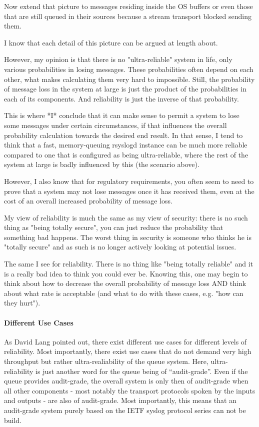 \documentclass[a4paper,10pt]{article}
\begin{document}
Now extend that picture to messages residing inside the OS buffers or even those that are still queued in their sources because a stream transport blocked sending them.

I know that each detail of this picture can be argued at length about.

However, my opinion is that there is no "ultra-reliable" system in life, only various probabilities in losing messages. These probabilities  often depend on each other, what makes calculating them very hard to impossible. Still, the probability of message loss in the system at large is just the product of the probabilities in each of its  components. And reliability is just the inverse of that probability.

This is where *I* conclude that it can make sense to permit a system to lose some messages under certain circumstances, if that influences the overall probability calculation towards the desired end result. In that sense, I tend to think that a fast, memory-queuing rsyslogd instance can be much more reliable compared to one that is configured as being ultra-reliable, where the rest of the system at large is badly influenced by this (the scenario above).

However, I also know that for regulatory requirements, you often seem to need to prove that a system may not lose messages once it has received them, even at the cost of an overall increased probability of message loss.

My view of reliability is much the same as my view of security: there is no such thing as "being totally secure", you can just reduce the probability that something bad happens. The worst thing in security is someone who thinks he is "totally secure" and as such is no longer actively looking at potential issues.

The same I see for reliability. There is no thing like "being totally reliable" and it is a really bad idea to think you could ever be. Knowing this, one may begin to think about how to decrease the overall probability of message loss AND think about what rate is acceptable (and what to do with these cases, e.g. "how can they hurt").

\paragraph{Different Use Cases}
As David Lang pointed out, there exist different use cases for different levels of reliability. Most importantly, there exist use cases that do not demand very high throughput but rather ultra-realiability of the queue system. Here, ultra-reliability is just another word for the queue being of ``audit-grade''. Even if the queue provides audit-grade, the overall system is only then of audit-grade when all other components - most notably the transport protocols spoken by the inputs and outputs - are also of audit-grade. Most importantly, this means that an audit-grade system purely based on the IETF syslog protocol series can not be build.
\end{document}

